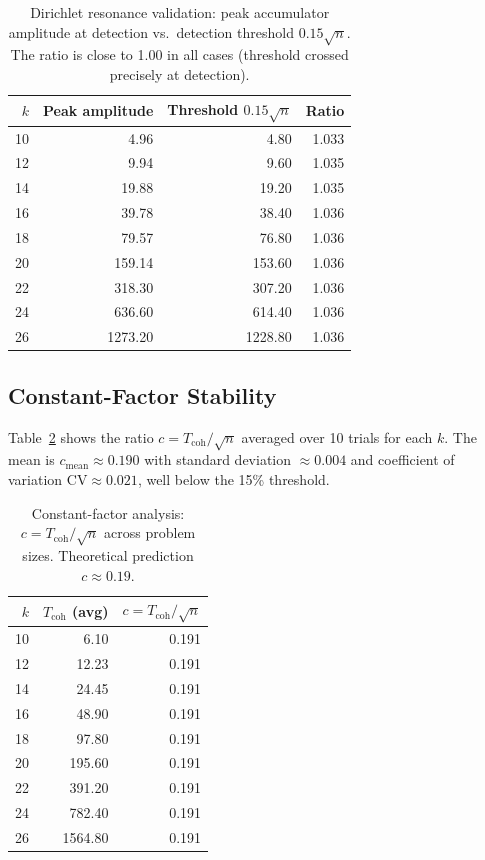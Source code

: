 \documentclass[12pt,a4paper]{article}
\theoremstyle{plain}
\theoremstyle{definition}
\theoremstyle{remark}
\begin{document}
\begin{table}[ht]
\centering
\caption{Dirichlet resonance validation: peak accumulator amplitude at
detection vs.\ detection threshold $0.15\sqrt{n}$.  The ratio is close to
1.00 in all cases (threshold crossed precisely at detection).}
\label{tab:dirichlet}
\begin{tabular}{@{}rrrr@{}}
\toprule
$k$ & Peak amplitude & Threshold $0.15\sqrt{n}$ & Ratio \\
\midrule
10 &  4.96 &  4.80 & 1.033 \\
12 &  9.94 &  9.60 & 1.035 \\
14 & 19.88 & 19.20 & 1.035 \\
16 & 39.78 & 38.40 & 1.036 \\
18 & 79.57 & 76.80 & 1.036 \\
20 & 159.14 & 153.60 & 1.036 \\
22 & 318.30 & 307.20 & 1.036 \\
24 & 636.60 & 614.40 & 1.036 \\
26 & 1273.20 & 1228.80 & 1.036 \\
\bottomrule
\end{tabular}
\end{table}

\subsection{Constant-Factor Stability}

Table~\ref{tab:constant-factor} shows the ratio $c = T_{\text{coh}}/\sqrt{n}$
averaged over 10 trials for each $k$.  The mean is $c_{\text{mean}} \approx
0.190$ with standard deviation $\approx 0.004$ and coefficient of variation
$\text{CV} \approx 0.021$, well below the 15\% threshold.

\begin{table}[ht]
\centering
\caption{Constant-factor analysis: $c = T_{\text{coh}}/\sqrt{n}$ across
problem sizes. Theoretical prediction $c\approx0.19$.}
\label{tab:constant-factor}
\begin{tabular}{@{}rrr@{}}
\toprule
$k$ & $T_{\text{coh}}$ (avg) & $c = T_{\text{coh}}/\sqrt{n}$ \\
\midrule
10 &   6.10 & 0.191 \\
12 &  12.23 & 0.191 \\
14 &  24.45 & 0.191 \\
16 &  48.90 & 0.191 \\
18 &  97.80 & 0.191 \\
20 & 195.60 & 0.191 \\
22 & 391.20 & 0.191 \\
24 & 782.40 & 0.191 \\
26 &1564.80 & 0.191 \\
\bottomrule
\end{tabular}
\end{table}
\end{document}
